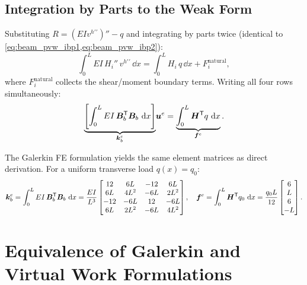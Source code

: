 \subsection{Integration by Parts to the Weak Form}

Substituting $R = (EI v^{h\prime\prime})'' - q$ and integrating by parts
twice (identical to \cref{eq:beam_pvw_ibp1,eq:beam_pvw_ibp2}):
\begin{equation}
    \int_0^L EI\,H_i''\,v^{h\prime\prime}\,\dd x
    = \int_0^L H_i\,q\,\dd x + F_i^{\mathrm{natural}} ,
    \label{eq:beam_galerkin_weak_i}
\end{equation}
where $F_i^{\mathrm{natural}}$ collects the shear/moment boundary terms.
Writing all four rows simultaneously:
\begin{equation}
    \underbrace{\left[\int_0^L EI\,\bm{B}_b^{\mathsf{T}}\bm{B}_b\,\,\mathrm{d} x\right]}_{\bm{k}^e_b}
    \!\bm{u}^e
    = \underbrace{\int_0^L \bm{H}^{\mathsf{T}} q\,\,\mathrm{d} x}_{\bm{f}^e} .
    \label{eq:beam_galerkin_system}
\end{equation}

\begin{importantbox}
The Galerkin FE formulation yields the same element matrices as direct
derivation. For a uniform transverse load $q(x) = q_0$:
\[
    \bm{k}^e_b = \int_0^L EI\,\bm{B}_b^{\mathsf{T}}\bm{B}_b\,\,\mathrm{d} x
    = \frac{EI}{L^3}\begin{bmatrix}
        12 & 6L & -12 & 6L \\ 6L & 4L^2 & -6L & 2L^2 \\
       -12 & -6L & 12 & -6L \\ 6L & 2L^2 & -6L & 4L^2
    \end{bmatrix} ,
    \quad
    \bm{f}^e = \int_0^L \bm{H}^{\mathsf{T}} q_0\,\,\mathrm{d} x
    = \frac{q_0 L}{12}\begin{bmatrix}6\\L\\6\\-L\end{bmatrix} .
\]
\end{importantbox}

\section{Equivalence of Galerkin and Virtual Work Formulations}
\label{sec:beam_galerkin_pvw}


